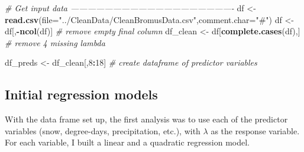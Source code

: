 \documentclass[]{article}
\newenvironment{Shaded}{\begin{snugshade}}{\end{snugshade}}
\newcommand{\CommentTok}[1]{\textcolor[rgb]{0.56,0.35,0.01}{\textit{#1}}}
\newcommand{\DataTypeTok}[1]{\textcolor[rgb]{0.13,0.29,0.53}{#1}}
\newcommand{\DecValTok}[1]{\textcolor[rgb]{0.00,0.00,0.81}{#1}}
\newcommand{\KeywordTok}[1]{\textcolor[rgb]{0.13,0.29,0.53}{\textbf{#1}}}
\newcommand{\NormalTok}[1]{#1}
\newcommand{\OperatorTok}[1]{\textcolor[rgb]{0.81,0.36,0.00}{\textbf{#1}}}
\newcommand{\StringTok}[1]{\textcolor[rgb]{0.31,0.60,0.02}{#1}}
\begin{document}
\begin{Shaded}
\begin{Highlighting}[]
\CommentTok{# Get input data ----------------------------------------------------------}
\NormalTok{df <-}\StringTok{ }\KeywordTok{read.csv}\NormalTok{(}\DataTypeTok{file=}\StringTok{"../CleanData/CleanBromusData.csv"}\NormalTok{,}\DataTypeTok{comment.char=}\StringTok{"#"}\NormalTok{)}
\NormalTok{df <-}\StringTok{ }\NormalTok{df[,}\OperatorTok{-}\KeywordTok{ncol}\NormalTok{(df)]                 }\CommentTok{# remove empty final column}
\NormalTok{df_clean <-}\StringTok{ }\NormalTok{df[}\KeywordTok{complete.cases}\NormalTok{(df),]  }\CommentTok{# remove 4 missing lambda}

\NormalTok{df_preds <-}\StringTok{ }\NormalTok{df_clean[,}\DecValTok{8}\OperatorTok{:}\DecValTok{18}\NormalTok{]           }\CommentTok{# create dataframe of predictor variables}
\end{Highlighting}
\end{Shaded}

\hypertarget{initial-regression-models}{%
\subsection{Initial regression models}\label{initial-regression-models}}

With the data frame set up, the first analysis was to use each of the
predictor variables (snow, degree-days, precipitation, etc.), with
\(\lambda\) as the response variable. For each variable, I built a
linear and a quadratic regression model.
\end{document}
